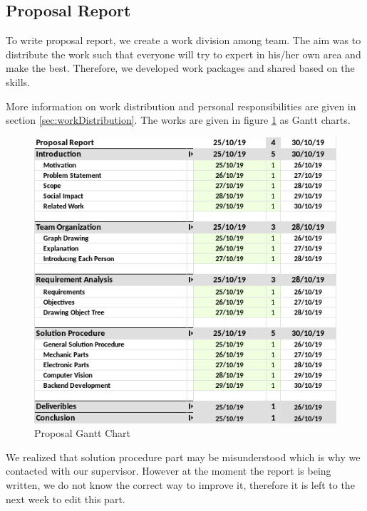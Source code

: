 \subsection{Proposal Report}
To write proposal report, we create a work division among team. The aim was to distribute the work such that everyone will try to expert in his/her own area and make the best. Therefore, we developed work packages and shared based on the skills.

More information on work distribution and personal responsibilities are given in section \ref{sec:workDistribution}. The works are given in figure \ref{fig:ganttChart} as Gantt charts.

\begin{figure}
    \centering
    \includegraphics[width=\linewidth]{img/proposalGanttChart.png}
    \caption{Proposal Gantt Chart}
    \label{fig:ganttChart}
\end{figure}

We realized that solution procedure part may be misunderstood which is why we contacted with our supervisor. However at the moment the report is being written, we do not know the correct way to improve it, therefore it is left to the next week to edit this part.